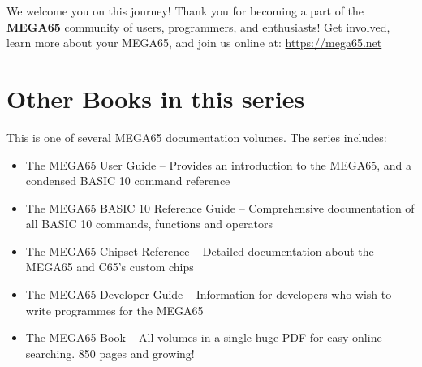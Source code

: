 We welcome you on this journey! Thank you for becoming a part of the {\bf MEGA65} community of users, programmers, and enthusiasts! Get involved, learn more about your MEGA65, and join us online at: \url{https://mega65.net}


\section{Other Books in this series}

This is one of several MEGA65 documentation volumes.  The series includes:

\begin{itemize}
	\item The MEGA65 User Guide -- Provides an introduction to the MEGA65, and a condensed BASIC 10 command reference
	\item The MEGA65 BASIC 10 Reference Guide -- Comprehensive documentation of all BASIC 10 commands, functions and operators
	\item The MEGA65 Chipset Reference -- Detailed documentation about the MEGA65 and C65's custom chips
	\item The MEGA65 Developer Guide -- Information for developers who wish to write programmes for the MEGA65
	\item The MEGA65 Book -- All volumes in a single huge PDF for easy online searching. 850 pages and growing!
\end{itemize}
